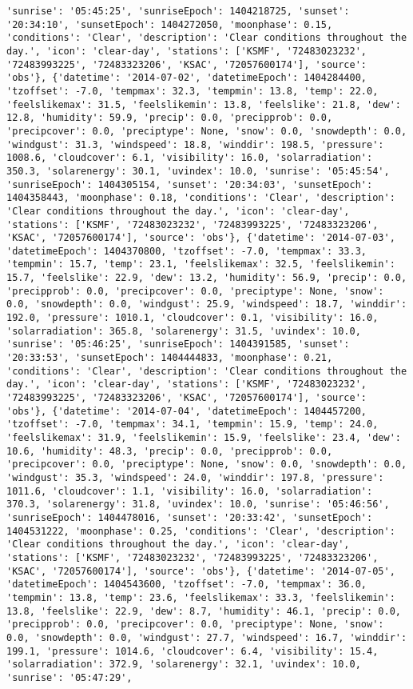\documentclass[
  letterpaper,
  DIV=11,
  numbers=noendperiod]{scrartcl}
\begin{document}
\begin{verbatim}
'sunrise': '05:45:25', 'sunriseEpoch': 1404218725, 'sunset': '20:34:10', 'sunsetEpoch': 1404272050, 'moonphase': 0.15, 'conditions': 'Clear', 'description': 'Clear conditions throughout the day.', 'icon': 'clear-day', 'stations': ['KSMF', '72483023232', '72483993225', '72483323206', 'KSAC', '72057600174'], 'source': 'obs'}, {'datetime': '2014-07-02', 'datetimeEpoch': 1404284400, 'tzoffset': -7.0, 'tempmax': 32.3, 'tempmin': 13.8, 'temp': 22.0, 'feelslikemax': 31.5, 'feelslikemin': 13.8, 'feelslike': 21.8, 'dew': 12.8, 'humidity': 59.9, 'precip': 0.0, 'precipprob': 0.0, 'precipcover': 0.0, 'preciptype': None, 'snow': 0.0, 'snowdepth': 0.0, 'windgust': 31.3, 'windspeed': 18.8, 'winddir': 198.5, 'pressure': 1008.6, 'cloudcover': 6.1, 'visibility': 16.0, 'solarradiation': 350.3, 'solarenergy': 30.1, 'uvindex': 10.0, 'sunrise': '05:45:54', 'sunriseEpoch': 1404305154, 'sunset': '20:34:03', 'sunsetEpoch': 1404358443, 'moonphase': 0.18, 'conditions': 'Clear', 'description': 'Clear conditions throughout the day.', 'icon': 'clear-day', 'stations': ['KSMF', '72483023232', '72483993225', '72483323206', 'KSAC', '72057600174'], 'source': 'obs'}, {'datetime': '2014-07-03', 'datetimeEpoch': 1404370800, 'tzoffset': -7.0, 'tempmax': 33.3, 'tempmin': 15.7, 'temp': 23.1, 'feelslikemax': 32.5, 'feelslikemin': 15.7, 'feelslike': 22.9, 'dew': 13.2, 'humidity': 56.9, 'precip': 0.0, 'precipprob': 0.0, 'precipcover': 0.0, 'preciptype': None, 'snow': 0.0, 'snowdepth': 0.0, 'windgust': 25.9, 'windspeed': 18.7, 'winddir': 192.0, 'pressure': 1010.1, 'cloudcover': 0.1, 'visibility': 16.0, 'solarradiation': 365.8, 'solarenergy': 31.5, 'uvindex': 10.0, 'sunrise': '05:46:25', 'sunriseEpoch': 1404391585, 'sunset': '20:33:53', 'sunsetEpoch': 1404444833, 'moonphase': 0.21, 'conditions': 'Clear', 'description': 'Clear conditions throughout the day.', 'icon': 'clear-day', 'stations': ['KSMF', '72483023232', '72483993225', '72483323206', 'KSAC', '72057600174'], 'source': 'obs'}, {'datetime': '2014-07-04', 'datetimeEpoch': 1404457200, 'tzoffset': -7.0, 'tempmax': 34.1, 'tempmin': 15.9, 'temp': 24.0, 'feelslikemax': 31.9, 'feelslikemin': 15.9, 'feelslike': 23.4, 'dew': 10.6, 'humidity': 48.3, 'precip': 0.0, 'precipprob': 0.0, 'precipcover': 0.0, 'preciptype': None, 'snow': 0.0, 'snowdepth': 0.0, 'windgust': 35.3, 'windspeed': 24.0, 'winddir': 197.8, 'pressure': 1011.6, 'cloudcover': 1.1, 'visibility': 16.0, 'solarradiation': 370.3, 'solarenergy': 31.8, 'uvindex': 10.0, 'sunrise': '05:46:56', 'sunriseEpoch': 1404478016, 'sunset': '20:33:42', 'sunsetEpoch': 1404531222, 'moonphase': 0.25, 'conditions': 'Clear', 'description': 'Clear conditions throughout the day.', 'icon': 'clear-day', 'stations': ['KSMF', '72483023232', '72483993225', '72483323206', 'KSAC', '72057600174'], 'source': 'obs'}, {'datetime': '2014-07-05', 'datetimeEpoch': 1404543600, 'tzoffset': -7.0, 'tempmax': 36.0, 'tempmin': 13.8, 'temp': 23.6, 'feelslikemax': 33.3, 'feelslikemin': 13.8, 'feelslike': 22.9, 'dew': 8.7, 'humidity': 46.1, 'precip': 0.0, 'precipprob': 0.0, 'precipcover': 0.0, 'preciptype': None, 'snow': 0.0, 'snowdepth': 0.0, 'windgust': 27.7, 'windspeed': 16.7, 'winddir': 199.1, 'pressure': 1014.6, 'cloudcover': 6.4, 'visibility': 15.4, 'solarradiation': 372.9, 'solarenergy': 32.1, 'uvindex': 10.0, 'sunrise': '05:47:29', 
\end{verbatim}
\end{document}
